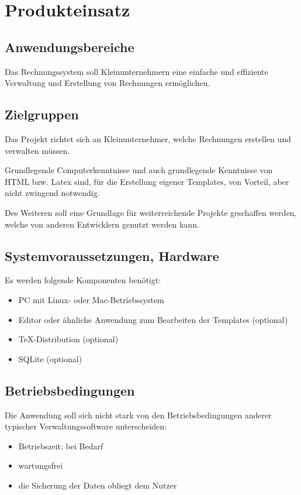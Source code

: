
\section{Produkteinsatz}


\subsection{Anwendungsbereiche}

Das Rechnungssystem soll Kleinunternehmern eine einfache und effiziente Verwaltung und Erstellung von Rechnungen ermöglichen.

\subsection{Zielgruppen}

Das Projekt richtet sich an Kleinunternehmer, welche Rechnungen erstellen und verwalten müssen.

Grundlegende Computerkenntnisse und auch grundlegende Kenntnisse von HTML bzw. Latex sind, für die Erstellung eigener Templates, von Vorteil, aber nicht zwingend notwendig.

Des Weiteren soll eine Grundlage für weiterreichende Projekte geschaffen werden, welche von anderen Entwicklern genutzt werden kann.

\subsection{Systemvoraussetzungen, Hardware}
Es werden folgende Komponenten benötigt:
\begin{itemize}
	\item PC mit Linux- oder Mac-Betriebssystem
	\item Editor oder ähnliche Anwendung zum Bearbeiten der Templates (optional)
	\item TeX-Distribution (optional)
	\item SQLite (optional)
\end{itemize}

\subsection{Betriebsbedingungen}
Die Anwendung soll sich nicht stark von den Betriebsbedingungen anderer typischer Verwaltungssoftware unterscheiden:

\begin{itemize}
	\item Betriebszeit: bei Bedarf
	\item wartungsfrei
	\item die Sicherung der Daten obliegt dem Nutzer
\end{itemize}
